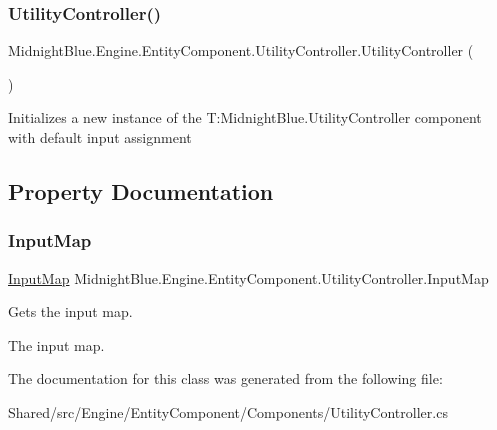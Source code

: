 \subsubsection{\texorpdfstring{Utility\+Controller()}{UtilityController()}}
{\footnotesize\ttfamily Midnight\+Blue.\+Engine.\+Entity\+Component.\+Utility\+Controller.\+Utility\+Controller (\begin{DoxyParamCaption}{ }\end{DoxyParamCaption})\hspace{0.3cm}{\ttfamily [inline]}}



Initializes a new instance of the T\+:\+Midnight\+Blue.\+Utility\+Controller component with default input assignment 



\subsection{Property Documentation}
\hypertarget{class_midnight_blue_1_1_engine_1_1_entity_component_1_1_utility_controller_a624d6316ccd2a07aef190e2d56b98a17}{}\label{class_midnight_blue_1_1_engine_1_1_entity_component_1_1_utility_controller_a624d6316ccd2a07aef190e2d56b98a17} 
\subsubsection{\texorpdfstring{Input\+Map}{InputMap}}
{\footnotesize\ttfamily \hyperlink{class_midnight_blue_1_1_engine_1_1_i_o_1_1_input_map}{Input\+Map} Midnight\+Blue.\+Engine.\+Entity\+Component.\+Utility\+Controller.\+Input\+Map\hspace{0.3cm}{\ttfamily [get]}}



Gets the input map. 

The input map.

The documentation for this class was generated from the following file\+:\begin{DoxyCompactItemize}
\item 
Shared/src/\+Engine/\+Entity\+Component/\+Components/Utility\+Controller.\+cs\end{DoxyCompactItemize}

